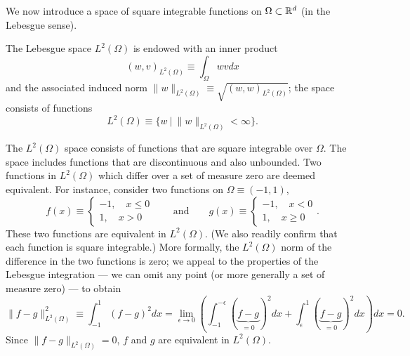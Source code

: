 We now introduce a space of square integrable functions on $\Omega \subset \mathbb{R}^d$ (in the Lebesgue sense).
\begin{definition}
  The Lebesgue space $L^2(\Omega)$ is endowed with an inner product
  \begin{equation*}
    (w,v)_{L^2(\Omega)} \equiv \int_\Omega w v dx
  \end{equation*}
  and the associated induced norm $\| w \|_{L^2(\Omega)} \equiv \sqrt{(w,w)_{L^2(\Omega)}}$; the space consists of functions
  \begin{equation*}
    L^2(\Omega) \equiv \{ w \ | \ \| w \|_{L^2(\Omega)} < \infty \}.
  \end{equation*}
\end{definition}
The $L^2(\Omega)$ space consists of functions that are square integrable over $\Omega$.  The space includes functions that are discontinuous and also unbounded.  Two functions in $L^2(\Omega)$ which differ over a set of measure zero are deemed equivalent. For instance, consider two functions on $\Omega \equiv (-1,1)$,
\begin{equation*}
  f(x) \equiv \begin{cases}
    -1, \quad x \leq 0 \\
    1, \quad x > 0
  \end{cases}
  \qquad \text{and} \qquad
  g(x) \equiv \begin{cases}
    -1, \quad x < 0 \\
    1, \quad x \geq 0
  \end{cases}.
\end{equation*}
These two functions are equivalent in $L^2(\Omega)$.  (We also readily confirm that each function is square integrable.) More formally, the $L^2(\Omega)$ norm of the difference in the two functions is zero; we appeal to the properties of the Lebesgue integration --- we can omit any point (or more generally a set of measure zero) --- to obtain
\begin{equation*}
  \| f - g \|^2_{L^2(\Omega)} \equiv \int_{-1}^1 (f - g)^2 dx =
  \lim_{\epsilon \to 0}
  (\int_{-1}^{-\epsilon} (\underbrace{f - g}_{=0})^2 dx + \int_{\epsilon}^{1} (\underbrace{f - g}_{=0})^2 dx )
  dx
  =0.
\end{equation*}
Since $\| f - g \|_{L^2(\Omega)} = 0$,  $f$ and $g$ are equivalent in $L^2(\Omega)$.

